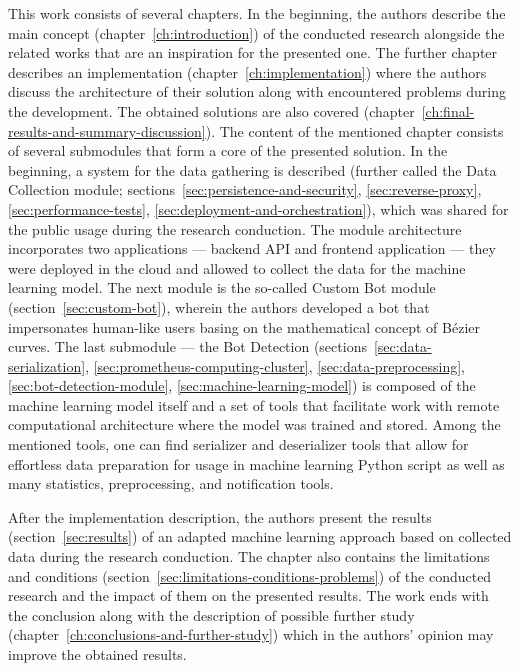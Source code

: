 This work consists of several chapters.
In the beginning, the authors describe the main concept (chapter~\ref{ch:introduction}) of the conducted research alongside the related works that are an inspiration for the presented one.
The further chapter describes an implementation (chapter~\ref{ch:implementation}) where the authors discuss the architecture of their solution along with encountered problems during the development.
The obtained solutions are also covered (chapter~\ref{ch:final-results-and-summary-discussion}).
The content of the mentioned chapter consists of several submodules that form a core of the presented solution.
In the beginning, a system for the data gathering is described (further called the Data Collection module; sections~\ref{sec:persistence-and-security}, \ref{sec:reverse-proxy}, \ref{sec:performance-tests}, \ref{sec:deployment-and-orchestration}), which was shared for the public usage during the research conduction.
The module architecture incorporates two applications --- backend API and frontend application --- they were deployed in the cloud and allowed to collect the data for the machine learning model.
The next module is the so-called Custom Bot module (section~\ref{sec:custom-bot}), wherein the authors developed a bot that impersonates human-like users basing on the mathematical concept of Bézier curves.
The last submodule --- the Bot Detection (sections~\ref{sec:data-serialization}, \ref{sec:prometheus-computing-cluster}, \ref{sec:data-preprocessing}, \ref{sec:bot-detection-module}, \ref{sec:machine-learning-model}) is composed of the machine learning model itself and a set of tools that facilitate work with remote computational architecture where the model was trained and stored.
Among the mentioned tools, one can find serializer and deserializer tools that allow for effortless data preparation for usage in machine learning Python script as well as many statistics, preprocessing, and notification tools.

After the implementation description, the authors present the results (section~\ref{sec:results}) of an adapted machine learning approach based on collected data during the research conduction.
The chapter also contains the limitations and conditions (section~\ref{sec:limitations-conditions-problems}) of the conducted research and the impact of them on the presented results.
The work ends with the conclusion along with the description of possible further study (chapter~\ref{ch:conclusions-and-further-study}) which in the authors' opinion may improve the obtained results.